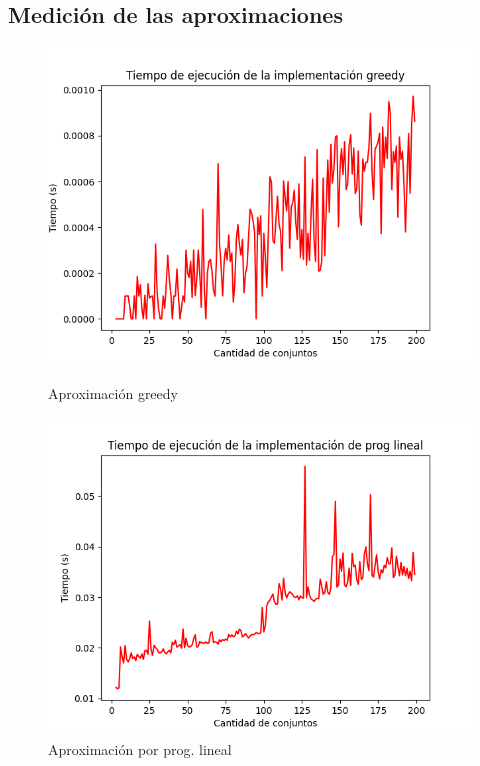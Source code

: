 \subsection{Medición de las aproximaciones}
\begin{figure}[H]
    \begin{minipage}{0.5\textwidth}
        \centering
        \includegraphics[width=\linewidth]{graficos/greed.png}
        \caption{Aproximación greedy}
        \label{fig:imagen1}
    \end{minipage}%
    \begin{minipage}{0.5\textwidth}
        \centering
        \includegraphics[width=\linewidth]{graficos/continous.png}
        \caption{Aproximación por prog. lineal}
        \label{fig:imagen2}
    \end{minipage}
\end{figure}

